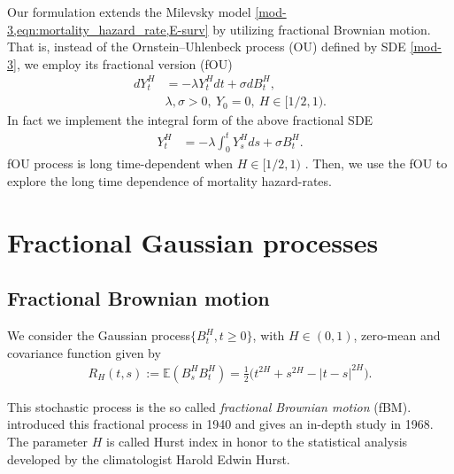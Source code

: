 \documentclass[smallextended]{svjour3}
\newcommand{\E}{\mathbb{E}}
\begin{document}
        Our formulation extends the Milevsky model 
    \cref{mod-3,eqn:mortality_hazard_rate,E-surv} by utilizing  fractional 
    Brownian motion. That is, instead of the Ornstein–Uhlenbeck process 
    (OU) defined by SDE \eqref{mod-3}, we employ its fractional version
    (fOU)
    \begin{equation}
        \label{mod2}
        \begin{aligned}
            dY_t^H & 
                =
                - \lambda Y_t ^ H dt 
                + \sigma dB_t ^ H, 
                \\
                 & \lambda, \sigma > 0,
                  \ Y_0 = 0,
                  \ H \in [1 / 2, 1) .
        \end{aligned}
    \end{equation}
    In fact we implement the integral form of the above fractional SDE
    \begin{align}
        \label{mod3}
        Y_t ^ H & =
            - \lambda
            \int_0 ^ t 
                Y_s ^ H ds 
                + 
                \sigma B_t ^ H.
    \end{align}
    fOU process is long time-dependent when $H \in [1/2,1)$ 
    \citep[for details see][]{ch-ka-ma,Anh2002,Hu2005,Kleptsyna2002}. Then, we 
    use the fOU to explore the long time dependence of mortality hazard-rates.


\section{Fractional Gaussian processes} \label{fgn}
    \subsection{Fractional Brownian motion} \label{fBm}
        We consider the Gaussian process$\{B_t^H,t\ge 0\}$, with $H\in (0,1)$,
    zero-mean and covariance function given by
    \begin{align}
        R_H(t,s):=
            \E(
                B_s^H B_t^H
            )
            =
            \tfrac{1}{2}
            \big(
                t ^ {2 H} + s ^ {2 H}
                - |t - s| ^ {2 H}
            \big).\label{s1.1}
    \end{align}
%

        This stochastic process is the so called 
    \emph{fractional Brownian motion} (fBM). 
    \citeauthor{ko} introduced this fractional process 
    in 1940 and \citeauthor{ma-va} gives an in-depth study in 1968.
    The parameter $H$ is called Hurst index in honor to the statistical 
    analysis developed by the climatologist Harold Edwin Hurst. 
    
\end{document}
